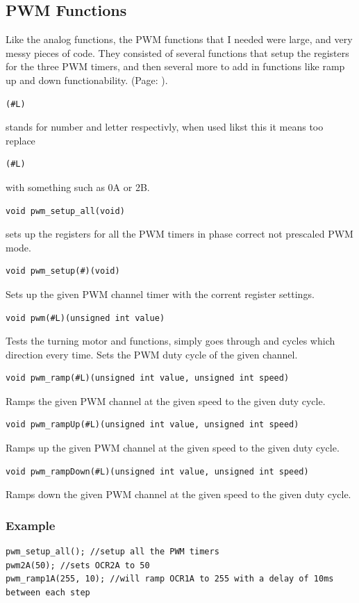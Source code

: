 \documentclass{article}
\begin{document}
\subsection{PWM Functions}
Like the analog functions, the PWM functions that I needed were large, and very messy pieces of code. They consisted of several functions that setup the registers for the three PWM timers, and then several more to add in functions like ramp up and down functionability. (Page: \pageref{pwm}).
\begin{verbatim}(#L)\end{verbatim} stands for number and letter respectivly, when used likst this it means too replace \begin{verbatim}(#L)\end{verbatim} with something such as 0A or 2B.
\begin{verbatim}void pwm_setup_all(void)\end{verbatim}
sets up the registers for all the PWM timers in phase correct not prescaled PWM mode.
\begin{verbatim}void pwm_setup(#)(void)\end{verbatim}
Sets up the given PWM channel timer with the corrent register settings.
\begin{verbatim}void pwm(#L)(unsigned int value)\end{verbatim}Tests the turning motor and functions, simply goes through and cycles which direction every time.
Sets the PWM duty cycle of the given channel.
\begin{verbatim}void pwm_ramp(#L)(unsigned int value, unsigned int speed)\end{verbatim}
Ramps the given PWM channel at the given speed to the given duty cycle.
\begin{verbatim}void pwm_rampUp(#L)(unsigned int value, unsigned int speed)\end{verbatim}
Ramps up the given PWM channel at the given speed to the given duty cycle.
\begin{verbatim}void pwm_rampDown(#L)(unsigned int value, unsigned int speed)\end{verbatim}
Ramps down the given PWM channel at the given speed to the given duty cycle.
\subsubsection{Example}
\begin{lstlisting}[caption={PWM examples},label=pwmex,frame=tbl]
pwm_setup_all(); //setup all the PWM timers
pwm2A(50); //sets OCR2A to 50
pwm_ramp1A(255, 10); //will ramp OCR1A to 255 with a delay of 10ms between each step

\end{lstlisting}
\end{document}
